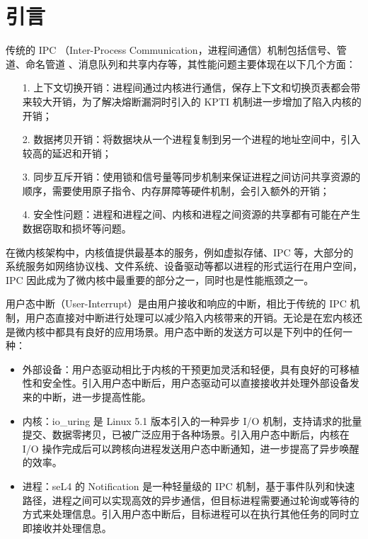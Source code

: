 
\chapter{引言}

传统的 IPC （Inter-Process Communication，进程间通信）机制包括信号、管道、命名管道 、消息队列和共享内存等\cite{modernos}，其性能问题主要体现在以下几个方面：

\begin{itemize}
    \item[1.] 上下文切换开销：进程间通过内核进行通信，保存上下文和切换页表都会带来较大开销，为了解决熔断漏洞时引入的 KPTI 机制进一步增加了陷入内核的开销\cite{kpti}；
    \item[2.] 数据拷贝开销：将数据块从一个进程复制到另一个进程的地址空间中，引入较高的延迟和开销；
    \item[3.] 同步互斥开销：使用锁和信号量等同步机制来保证进程之间访问共享资源的顺序，需要使用原子指令、内存屏障等硬件机制，会引入额外的开销；
    \item[4.] 安全性问题：进程和进程之间、内核和进程之间资源的共享都有可能在产生数据窃取和损坏等问题。
\end{itemize}

在微内核架构中，内核值提供最基本的服务，例如虚拟存储、IPC 等，大部分的系统服务如网络协议栈、文件系统、设备驱动等都以进程的形式运行在用户空间\cite{microkernel}，IPC 因此成为了微内核中最重要的部分之一，同时也是性能瓶颈之一。

用户态中断（User-Interrupt）是由用户接收和响应的中断，相比于传统的 IPC 机制，用户态直接对中断进行处理可以减少陷入内核带来的开销。无论是在宏内核还是微内核中都具有良好的应用场景。用户态中断的发送方可以是下列中的任何一种：

\begin{itemize}
    \item 外部设备：用户态驱动\cite{userdriver}相比于内核的干预更加灵活和轻便，具有良好的可移植性和安全性。引入用户态中断后，用户态驱动可以直接接收并处理外部设备发来的中断，进一步提高性能。
    \item 内核：io\_uring \cite{iouring}是 Linux 5.1 版本引入的一种异步 I/O 机制，支持请求的批量提交、数据零拷贝，已被广泛应用于各种场景。引入用户态中断后，内核在 I/O 操作完成后可以跨核向进程发送用户态中断通知，进一步提高了异步唤醒的效率。
    \item 进程：seL4 的 Notification \cite{sel4}是一种轻量级的 IPC 机制，基于事件队列和快速路径，进程之间可以实现高效的异步通信，但目标进程需要通过轮询或等待的方式来处理信息。引入用户态中断后，目标进程可以在执行其他任务的同时立即接收并处理信息。
\end{itemize}

